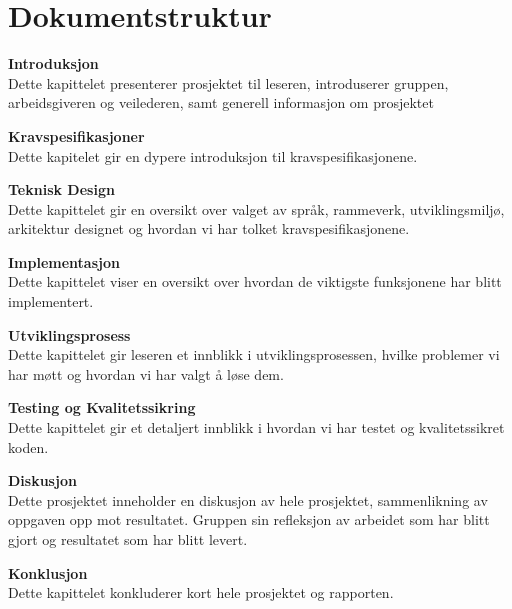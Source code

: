 \section{Dokumentstruktur} 
\begin{description}  
\item 
\item \textbf{Introduksjon}\\
        Dette kapittelet presenterer prosjektet til leseren, introduserer gruppen, arbeidsgiveren og veilederen, samt generell informasjon om prosjektet
\item \textbf{Kravspesifikasjoner} \\
        Dette kapitelet gir en dypere introduksjon til kravspesifikasjonene.
\item \textbf{Teknisk Design} \\
        Dette kapittelet gir en oversikt over valget av språk, rammeverk, utviklingsmiljø, arkitektur designet og hvordan vi har tolket kravspesifikasjonene.
\item \textbf{Implementasjon}\\
        Dette kapittelet viser en oversikt over hvordan de viktigste funksjonene har blitt implementert.
\item \textbf{Utviklingsprosess}\\
        Dette kapittelet gir leseren et innblikk i utviklingsprosessen, hvilke problemer vi har møtt og hvordan vi har valgt å løse dem.
\item \textbf{Testing og Kvalitetssikring}\\
        Dette kapittelet gir et detaljert innblikk i hvordan vi har testet og kvalitetssikret koden.
\item \textbf{Diskusjon}\\
        Dette prosjektet inneholder en diskusjon av hele prosjektet, sammenlikning av oppgaven opp mot resultatet. Gruppen sin refleksjon av arbeidet som har blitt gjort og resultatet som har blitt levert.
\item \textbf{Konklusjon} \\
        Dette kapittelet konkluderer kort hele prosjektet og rapporten.
\end{description}







  